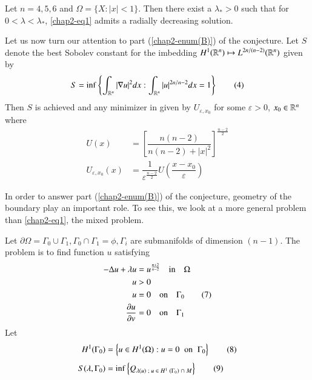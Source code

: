 \begin{theorem}\label{chap2-thm3}
Let $n= 4, 5, 6$ and $\Omega = \{X: |x|< 1\}$. Then there exist a $\lambda_{*} > 0$ such that for $0 < \lambda < \lambda_{*}$, \eqref{chap2-eq1} admits a radially decreasing solution.

Let us now turn our attention to part (\ref{chap2-enum(B)}) of the conjecture. Let $S$ denote the best Sobolev constant for the imbedding $H^{1}(\mathbb{R}^{n}) \mapsto  L^{2n/(n-2)}(\mathbb{R}^{n})$ given by  
\begin{equation*}
S = {\rm inf}\left\{ \int_{\mathbb{R}^{n}} |\nabla u|^{2}dx: \int_{\mathbb{R}^{n}} |u|^{2n/n-2}dx =1 \right \}\tag{4}\label{chap2-eq4}
\end{equation*}
Then $S$ is achieved and any minimizer in given by $U_{\varepsilon, x_{0}}$ for some $\varepsilon > 0$, $x_{0} \in \mathbb{R}^{n}$ where
\begin{align*}
U(x) &= \left[ \dfrac{n(n-2)}{n(n-2)+|x|^{2}}\right]^{\frac{n-2}{2}}\label{chap2-eq5}\tag{5}\\
U_{\varepsilon, x_{0}}(x) &= \dfrac{1}{\varepsilon^{\frac{n-2}{2}}}U \left(\dfrac{x-x_{0}}{\varepsilon}\right)\tag{6}\label{chap2-eq6}
\end{align*}   
\end{theorem}

In order to answer part ({\ref{chap2-enum(B)}}) of the conjecture, geometry of the boundary play an important role. To see this, we look at a more general problem than \eqref{chap2-eq1}, the mixed problem.

Let $\partial \Omega = \Gamma_{0}\cup  \Gamma_{1}, \Gamma_{0} \cap \Gamma_{1} = \phi, \Gamma_{i}$ are submanifolds of dimension $(n-1)$. The problem is to find function $u$ satisfying
 \begin{align*}
-\Delta u + \lambda u &= u ^{\frac{n+2}{n-2}} \quad {\rm in}\quad \Omega\nonumber\\
u &> 0 \nonumber\\
u &= 0 \quad {\rm on}\quad \Gamma_{0}\tag{7}\label{chap2-eq7}\\
\dfrac{\partial u}{\partial v} &= 0 \quad {\rm on}  \quad\Gamma_{1} \nonumber     
 \end{align*}
Let
\begin{align*}
H^{1}(\Gamma_{0}) &= \left\{u \in H^{1}(\Omega) : u = 0\;\; {\rm on}\;\; \Gamma_{0}\right\}\tag{8}\label{chap2-eq8}\\[4pt]
S(\lambda, \Gamma_{0}) &= {\rm inf}\left\{Q_{\lambda(u) \;; \;u \;\in\; H^{1}\; (\Gamma_{0})\; \cap\; M}\right\}\tag{9}\label{chap2-eq9}
\end{align*} 
\pageoriginale

